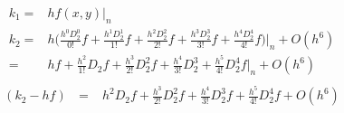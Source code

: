 \documentclass[12 pt]{article}
\begin{document}
{
\large
\begin{align*}
k_{1} =& hf(x,y)\big\vert_{n} \\
k_{2} =& h\bigg(\frac{h^{0}D_{2}^{0}}{0!}f + \frac{h^{1}D_{2}^{1}}{1!}f + \frac{h^{2}D_{2}^{2}}{2!}f + \frac{h^{3}D_{2}^{3}}{3!}f + \frac{h^{4}D_{2}^{4}}{4!}f\bigg)\bigg\vert_{n} + O(h^{6})\\
	  =& hf + \frac{h^{2}}{1!}D_{2}f + \frac{h^{3}}{2!}D_{2}^{2}f + \frac{h^{4}}{3!}D_{2}^{3} + \frac{h^{5}}{4!}D_{2}^{4}f\bigg\vert_{n} + O(h^{6})\\
\end{align*}
}
{
\large
\begin{align*}
(k_{2}-hf) \text{ }=&  h^{2}D_{2}f + \frac{h^{3}}{2!}D_{2}^{2}f + \frac{h^{4}}{3!}D_{2}^{3}f + \frac{h^{5}}{4!}D_{2}^{4}f + O(h^{6})\\
\end{align*}
}
\end{document}

